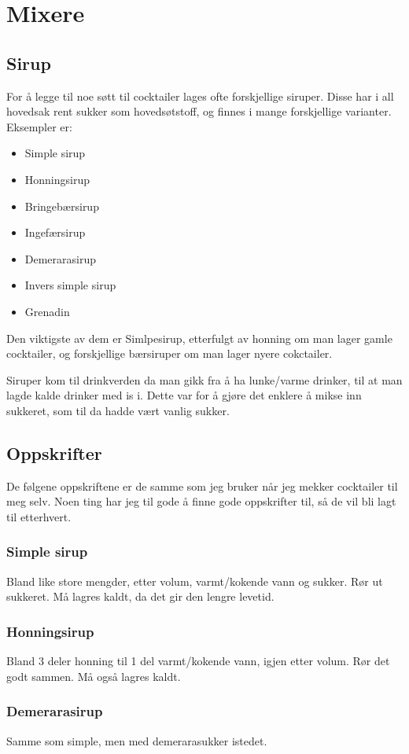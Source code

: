 \section{Mixere}
\subsection{Sirup}
For å legge til noe søtt til cocktailer lages ofte forskjellige siruper. Disse har i all hovedsak rent sukker som hovedsøtstoff, og finnes i mange forskjellige varianter. Eksempler er:
\begin{itemize}
    \item Simple sirup
    \item Honningsirup
    \item Bringebærsirup
    \item Ingefærsirup
    \item Demerarasirup
    \item Invers simple sirup
    \item Grenadin
\end{itemize}

Den viktigste av dem er Simlpesirup, etterfulgt av honning om man lager gamle cocktailer, og forskjellige bærsiruper om man lager nyere cokctailer.

Siruper kom til drinkverden da man gikk fra å ha lunke/varme drinker, til at man lagde kalde drinker med is i. Dette var for å gjøre det enklere å mikse inn sukkeret, som til da hadde vært vanlig sukker. 

\subsection{Oppskrifter}
De følgene oppskriftene er de samme som jeg bruker når jeg mekker cocktailer til meg selv. Noen ting har jeg til gode å finne gode oppskrifter til, så de vil bli lagt til etterhvert.
\subsubsection{Simple sirup}
Bland like store mengder, etter volum, varmt/kokende vann og sukker. Rør ut sukkeret. Må lagres kaldt, da det gir den lengre levetid.
\subsubsection{Honningsirup}
Bland 3 deler honning til 1 del varmt/kokende vann, igjen etter volum. Rør det godt sammen. Må også lagres kaldt.
\subsubsection{Demerarasirup}
Samme som simple, men med demerarasukker istedet.

